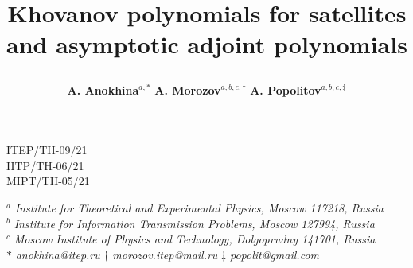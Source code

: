 \documentclass[11pt]{article}
\begin{document}
\title{{\Large {\bf
      Khovanov polynomials for satellites and asymptotic adjoint polynomials}
  	\vspace{-1cm}
    \date{}
    \author{
      {\bf A. Anokhina$^{a,*}$}
      {\bf A. Morozov$^{a,b,c,\dag}$}
      {\bf A. Popolitov$^{a,b,c,\ddag}$}
      \vspace{1cm}}
}}

\maketitle
\vspace{-6cm}

\begin{center}
	\hfill ITEP/TH-09/21\\
	\hfill IITP/TH-06/21\\
	\hfill MIPT/TH-05/21
\end{center}

\vspace{2.2cm}

\begin{center}
  $^a$ {\small {\it Institute for Theoretical and Experimental Physics, Moscow 117218, Russia}}\\
  $^b$ {\small {\it Institute for Information Transmission Problems, Moscow 127994, Russia}}\\
  $^c$ {\small {\it Moscow Institute of Physics and Technology, Dolgoprudny 141701, Russia }} \\
  \vspace{0.25cm}
  $*$ {\small {\it anokhina@itep.ru}} $\dag$ {\small {\it morozov.itep@mail.ru}}  $\ddag$ {\small {\it popolit@gmail.com}}
\end{center}

\vspace{0cm}
\end{document}
